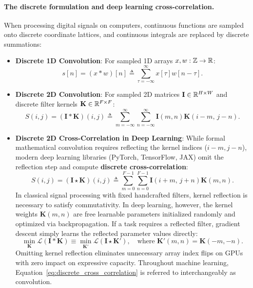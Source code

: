 \paragraph{The discrete formulation and deep learning cross-correlation.}
When processing digital signals on computers, continuous functions are sampled onto discrete coordinate lattices, and continuous integrals are replaced by discrete summations:
\begin{itemize}[leftmargin=*]
  \item \textbf{Discrete 1D Convolution}: For sampled 1D arrays $x, w: \mathbb{Z} \to \mathbb{R}$:
    \begin{equation}
    s[n] = (x * w)[n] \triangleq \sum_{\tau=-\infty}^{\infty} x[\tau] w[n - \tau].
    \label{eq:discrete_1d_convolution}
    \end{equation}
  \item \textbf{Discrete 2D Convolution}: For sampled 2D matrices $\mathbf{I} \in \mathbb{R}^{H \times W}$ and discrete filter kernels $\mathbf{K} \in \mathbb{R}^{F \times F}$:
    \begin{equation}
    S(i, j) = (\mathbf{I} * \mathbf{K})(i, j) \triangleq \sum_{m=-\infty}^{\infty} \sum_{n=-\infty}^{\infty} \mathbf{I}(m, n) \mathbf{K}(i - m, \, j - n).
    \label{eq:discrete_2d_convolution}
    \end{equation}
  \item \textbf{Discrete 2D Cross-Correlation in Deep Learning}: While formal mathematical convolution requires reflecting the kernel indices ($i - m, j - n$), modern deep learning libraries (PyTorch, TensorFlow, JAX) omit the reflection step and compute \textbf{discrete cross-correlation}:
    \begin{equation}
    S(i, j) = (\mathbf{I} \star \mathbf{K})(i, j) \triangleq \sum_{m=0}^{F-1} \sum_{n=0}^{F-1} \mathbf{I}(i + m, \, j + n) \mathbf{K}(m, n).
    \label{eq:discrete_cross_correlation}
    \end{equation}
    In classical signal processing with fixed handcrafted filters, kernel reflection is necessary to satisfy commutativity. In deep learning, however, the kernel weights $\mathbf{K}(m, n)$ are free learnable parameters initialized randomly and optimized via backpropagation. If a task requires a reflected filter, gradient descent simply learns the reflected parameter values directly:
    \begin{equation}
    \min_{\mathbf{K}} \mathcal{L}(\mathbf{I} * \mathbf{K}) \equiv \min_{\mathbf{K}'} \mathcal{L}(\mathbf{I} \star \mathbf{K}'), \quad \text{where } \mathbf{K}'(m, n) = \mathbf{K}(-m, -n).
    \end{equation}
    Omitting kernel reflection eliminates unnecessary array index flips on GPUs with zero impact on expressive capacity. Throughout machine learning, Equation~\eqref{eq:discrete_cross_correlation} is referred to interchangeably as convolution.
\end{itemize}

